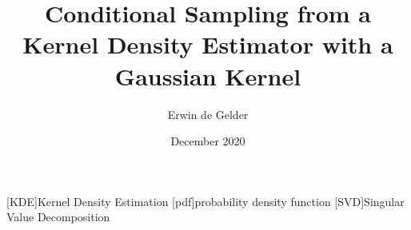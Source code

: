 \documentclass{article}
\title{Conditional Sampling from a Kernel Density Estimator with a Gaussian Kernel}
\author{Erwin de Gelder}
\date{December 2020}
\begin{document}
\begin{acronym}[AAAAAAAA]
	[KDE]{Kernel Density Estimation}
	[pdf]{probability density function}
	[SVD]{Singular Value Decomposition}
\end{acronym}

\maketitle










\printbibliography
\end{document}
